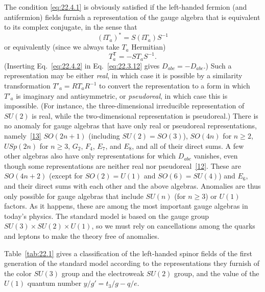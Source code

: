 The condition \eqref{eq:22.4.1} is obviously satisfied if the left-handed
fermion (and antifermion) fields furnish a representation of the gauge
algebra that is equivalent to its complex conjugate, in the sense that
\[
 (\ii T_a)^*=S(\ii T_a)S^{-1}
\]
or equivalently (since we always take $T_a$ Hermitian)
\begin{equation}
 T_a^{\mathsf T}=-S T_a S^{-1}.
 \tag{22.4.2}\label{eq:22.4.2}
\end{equation}
(Inserting Eq.~\eqref{eq:22.4.2} in Eq.~\eqref{eq:22.3.12} gives
$D_{abc}=-D_{abc}$.) Such a representation
may be either \emph{real}, in which case it is possible by a similarity
transformation $T'_a=R T_a R^{-1}$ to convert the representation
to a form in which $T'_a$ is imaginary and antisymmetric, or
\emph{pseudoreal}, in which case this is impossible. (For instance, the
three-dimensional irreducible representation of $SU(2)$ is real, while
the two-dimensional representation is pseudoreal.) There is no anomaly
for gauge algebras that have only real or pseudoreal representations,
namely~\hyperref[ch22-ref-13]{[13]} $SO(2n+1)$ (including
$SU(2)=SO(3)$), $SO(4n)$ for $n\geq2$, $USp(2n)$ for $n\geq3$,
$G_2$, $F_4$, $E_7$, and $E_8$, and all of their direct sums. A few other
algebras also have only representations for which
$D_{abc}$ vanishes, even though some representations are
neither real nor pseudoreal~\hyperref[ch22-ref-12]{[12]}. These are
$SO(4n+2)$ (except for $SO(2)=U(1)$ and $SO(6)=SU(4)$) and $E_6$, and
their direct sums with each other and the above algebras. Anomalies are
thus only possible for gauge algebras that include $SU(n)$ (for $n\geq3$)
or $U(1)$ factors. As it happens, these are among the most important gauge
algebras in today's physics. The standard model is based on the gauge
group $SU(3)\times SU(2)\times U(1)$, so we must rely on cancellations among
the quarks and leptons to make the theory free of anomalies.

Table~\ref{tab:22.1} gives a classification of the left-handed spinor fields
of the first generation of the standard model according to the
representations they furnish of the color $SU(3)$ group and the electroweak
$SU(2)$ group, and the value of the $U(1)$ quantum number
$y/g'=t_3/g-q/e$.

